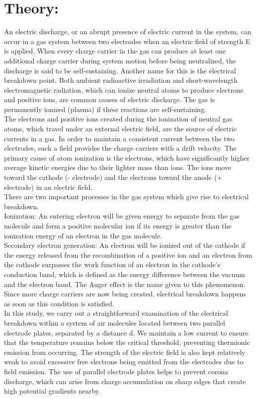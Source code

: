 \documentclass[]{report}[12 pt]
\begin{document}
\section*{Theory:}
An electric discharge, or an abrupt presence of electric current in the system, can occur in a gas system between two electrodes when an electric field of strength E is applied. When every charge carrier in the gas can produce at least one additional charge carrier during system motion before being neutralized, the discharge is said to be self-sustaining. Another name for this is the electrical breakdown point. Both ambient radioactive irradiation and short-wavelength electromagnetic radiation, which can ionize neutral atoms to produce electrons and positive ions, are common causes of electric discharge. The gas is permanently ionized (plasma) if these reactions are self-sustaining.\\
The electrons and positive ions created during the ionization of neutral gas atoms, which travel under an external electric field, are the source of electric currents in a gas. In order to maintain a consistent current between the two electrodes, such a field provides the charge carriers with a drift velocity. The primary cause of atom ionization is the electrons, which have significantly higher average kinetic energies due to their lighter mass than ions. The ions move toward the cathode (- electrode) and the electrons toward the anode (+ electrode) in an electric field.\\
There are two important processes in the gas system which give rise to electrical breakdown.\\
Ionization: An entering electron will be given energy to separate from the gas molecule and form a positive molecular ion if its energy is greater than the ionization energy of an electron in the gas molecule.\\
Secondary electron generation: An electron will be ionized out of the cathode if the energy released from the recombination of a positive ion and an electron from the cathode surpasses the work function of an electron in the cathode's conduction band, which is defined as the energy difference between the vacuum and the electron band. The Auger effect is the name given to this phenomenon. Since more charge carriers are now being created, electrical breakdown happens as soon as this condition is satisfied.\\
In this study, we carry out a straightforward examination of the electrical breakdown within a system of air molecules located between two parallel electrode plates, separated by a distance d. We maintain a low current to ensure that the temperature remains below the critical threshold, preventing thermionic emission from occurring. The strength of the electric field is also kept relatively weak to avoid excessive free electrons being emitted from the electrodes due to field emission. The use of parallel electrode plates helps to prevent corona discharge, which can arise from charge accumulation on sharp edges that create high potential gradients nearby.\\
\end{document}
